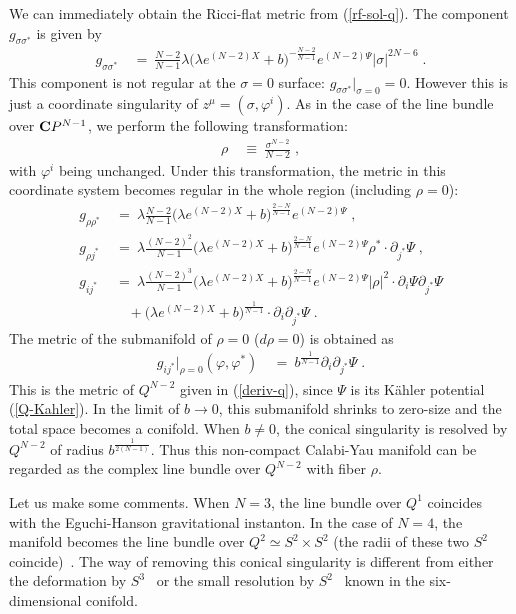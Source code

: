\documentclass[a4paper,11pt]{article}
\newcommand{\del}{\partial}
\newcommand{\dps}{\displaystyle}
\newcommand{\kahler}{K\"{a}hler }
\newcommand{\bsubeq}{\begin{subequations}}
\newcommand{\esubeq}{\end{subequations}}
\begin{document}
{We can immediately obtain the Ricci-flat metric from (\ref{rf-sol-q}).
The component $g_{\sigma \sigma^*}$ is given by
\begin{align}
g_{\sigma \sigma^*} 
\ &= \ 
\frac{N-2}{N-1} \lambda 
\big( \lambda e^{(N-2) X} + b \big)^{-\frac{N-2}{N-1}} 
e^{(N-2) \Psi} |\sigma|^{2N-6} \; .
\end{align}
This component is not regular at the $\sigma = 0$ surface: $g_{\sigma
\sigma^*} |_{\sigma = 0} = 0$.
However this is just a coordinate singularity of $z^{\mu} =
(\sigma , \varphi^i)$.
As in the case of the line bundle over ${\bf C}P^{N-1}$, 
we perform the following transformation:
\begin{align}\rho \ &\equiv \ \frac{\sigma^{N-2}}{N-2} \; ,
\end{align}
with $\varphi^i$ being unchanged.
Under this transformation, 
the metric in this coordinate system becomes regular in the whole region
(including $\rho = 0$):
\bsubeq
\begin{align}
g_{\rho \rho^*} \ &= \ \lambda \frac{N-2}{N-1} 
 \big( \lambda e^{(N-2) X} + b \big)^{\frac{2-N}{N-1}} e^{(N-2) \Psi}
 \; , \\
g_{\rho j^*} \ &= \ \lambda \frac{(N-2)^2}{N-1} 
 \big( \lambda e^{(N-2) X} + b \big)^{\frac{2-N}{N-1}} e^{(N-2) \Psi} 
 \rho^* \cdot \del_{j^*} \Psi \; , \\
g_{i j^*} \ &= \ \lambda \frac{(N-2)^3}{N-1} 
 \big( \lambda e^{(N-2) X} + b \big)^{\frac{2-N}{N-1}} e^{(N-2) \Psi} 
 |\rho|^2 \cdot \del_i \Psi \del_{j^*} \Psi \nonumber \\
\ & \ \ \ \ 
 + \big( \lambda e^{(N-2) X} + b \big)^{\frac{1}{N-1}} 
 \cdot \del_i \del_{j^*} \Psi \; . 
\end{align}
\esubeq
The metric of the submanifold of $\rho = 0$ ($d \rho = 0$) 
is obtained as
\begin{align}
\dps g_{i j^*} \big|_{\rho = 0} (\varphi, \varphi^*) 
\ &= \
b^{\frac{1}{N-1}} \del_i \del_{j^*} \Psi \; .
\end{align}
This is the metric of $Q^{N-2}$ given in (\ref{deriv-q}), 
since $\Psi$ is its \kahler potential (\ref{Q-Kahler}).
In the limit of $b \to 0$, 
this submanifold shrinks to zero-size and the total space becomes a
conifold.
When $b\neq 0$, 
the conical singularity is resolved by $Q^{N-2}$ of radius
$b^{\frac{1}{2(N-1)}}$. 
Thus this non-compact Calabi-Yau manifold can be 
regarded as the complex line
bundle over $Q^{N-2}$ with fiber $\rho$.

Let us make some comments.
When $N=3$, the line bundle over $Q^1$ coincides with the 
Eguchi-Hanson gravitational instanton.
In the case of $N=4$,
the manifold becomes the line bundle over $Q^2 \simeq S^2 \times S^2$
(the radii of these two $S^2$ coincide)~\cite{PT}.
The way of removing this conical singularity 
is different from either the
deformation by $S^3$~\cite{conifold,conifold2} 
or the small resolution by $S^2$~\cite{conifold} known 
in the six-dimensional conifold.  



}
\end{document}
